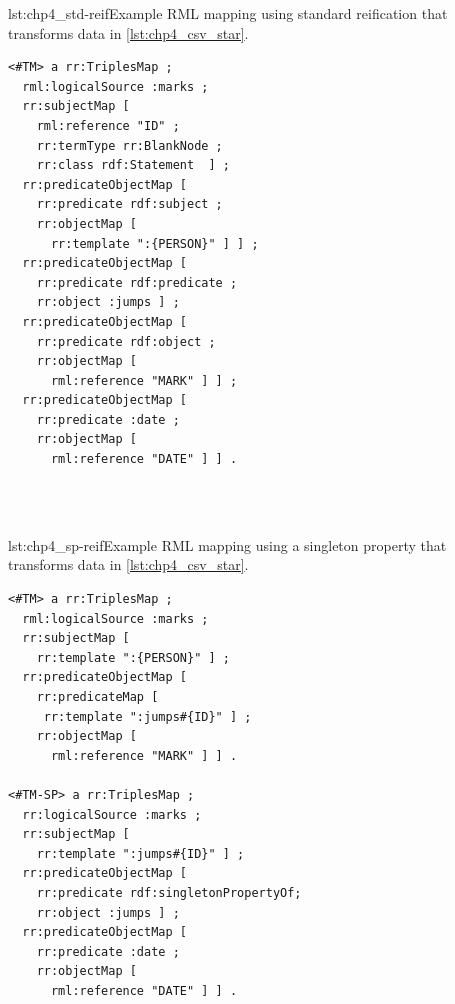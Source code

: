 \begin{minipage}{0.45\linewidth}
\begin{captionedlisting}{lst:chp4_std-reif}{Example RML mapping using standard reification that transforms data in \cref{lst:chp4_csv_star}.}
\centering
{\begin{lstlisting}[basicstyle=\ttfamily\small,label={list:example1},columns=flexible]
<#TM> a rr:TriplesMap ;
  rml:logicalSource :marks ;
  rr:subjectMap [ 
    rml:reference "ID" ;
    rr:termType rr:BlankNode ;
    rr:class rdf:Statement  ] ;
  rr:predicateObjectMap [ 
    rr:predicate rdf:subject ;
    rr:objectMap [
      rr:template ":{PERSON}" ] ] ;
  rr:predicateObjectMap [ 
    rr:predicate rdf:predicate ;
    rr:object :jumps ] ;
  rr:predicateObjectMap [ 
    rr:predicate rdf:object ;
    rr:objectMap [
      rml:reference "MARK" ] ] ;
  rr:predicateObjectMap [ 
    rr:predicate :date ;
    rr:objectMap [
      rml:reference "DATE" ] ] .
  
\end{lstlisting}}

\end{captionedlisting}
\end{minipage}
\,\,\,\,\hfill
\begin{minipage}{0.45\linewidth}
\begin{captionedlisting}{lst:chp4_sp-reif}{Example RML mapping using a singleton property that transforms data in \cref{lst:chp4_csv_star}.}
\centering
{{\begin{lstlisting}[basicstyle=\ttfamily\small,label={list:example1},columns=flexible]
<#TM> a rr:TriplesMap ;
  rml:logicalSource :marks ;
  rr:subjectMap [ 
    rr:template ":{PERSON}" ] ;
  rr:predicateObjectMap [ 
    rr:predicateMap [
     rr:template ":jumps#{ID}" ] ;
    rr:objectMap [
      rml:reference "MARK" ] ] .
      
<#TM-SP> a rr:TriplesMap ;
  rr:logicalSource :marks ;
  rr:subjectMap [ 
    rr:template ":jumps#{ID}" ] ;
  rr:predicateObjectMap [ 
    rr:predicate rdf:singletonPropertyOf;
    rr:object :jumps ] ;
  rr:predicateObjectMap [ 
    rr:predicate :date ;
    rr:objectMap [
      rml:reference "DATE" ] ] .
\end{lstlisting}}}
\end{captionedlisting}
\end{minipage}




